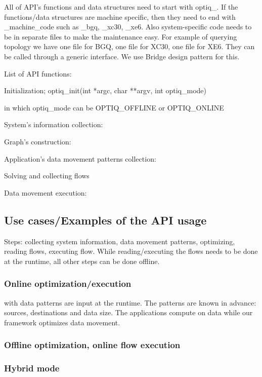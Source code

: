 \documentclass[letter]{article}
\begin{document}
All of API's functions and data structures need to start with optiq\_. If the functions/data structures are machine specific, then they need to end with \_machine\_code such as \_bgq, \_xc30, \_xe6. Also system-specific code needs to be in separate files to make the maintenance easy. For example of querying topology we have one file for BGQ, one file for XC30, one file for XE6. They can be called through a generic interface. We use Bridge design pattern for this.

List of API functions:

Initialization;
optiq\_init(int *argc, char **argv, int optiq\_mode)

in which optiq\_mode can be OPTIQ\_OFFLINE or OPTIQ\_ONLINE

System's information collection:

Graph's construction:

Application's data movement patterns collection:

Solving and collecting flows

Data movement execution:


\subsection{Use cases/Examples of the API usage}

Steps: collecting system information, data movement patterns, optimizing, reading flows, executing flow. While reading/executing the flows needs to be done at the runtime, all other steps can be done offline.

\subsubsection{Online optimization/execution} with data patterns are input at the runtime. The patterns are known in advance: sources, destinations and data size. The applications compute on data while our framework optimizes data movement.



\subsubsection{Offline optimization, online flow execution}

\subsubsection{Hybrid mode}
\end{document}
